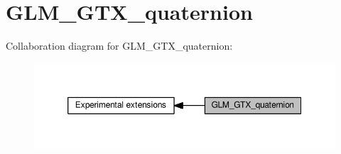\hypertarget{group__gtx__quaternion}{}\section{G\+L\+M\+\_\+\+G\+T\+X\+\_\+quaternion}
\label{group__gtx__quaternion}
Collaboration diagram for G\+L\+M\+\_\+\+G\+T\+X\+\_\+quaternion\+:
\nopagebreak
\begin{figure}[H]
\begin{center}
\leavevmode
\includegraphics[width=350pt]{d8/db2/group__gtx__quaternion}
\end{center}
\end{figure}

